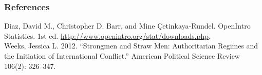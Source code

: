 \documentclass{beamer}\usepackage{graphicx, color}
\begin{document}
\begin{frame}[allowframebreaks]
  \frametitle{References}
  Diaz, David M., Christopher D. Barr, and Mine \c{C}etinkaya-Rundel. OpenIntro Statistics. 1st ed. \url{http://www.openintro.org/stat/downloads.php}. \\[0.25cm] 
  
  Weeks, Jessica L. 2012. “Strongmen and Straw Men: Authoritarian Regimes and the Initiation of International Conflict.” American Political Science Review 106(2): 326–347.
\end{frame}
\end{document}

